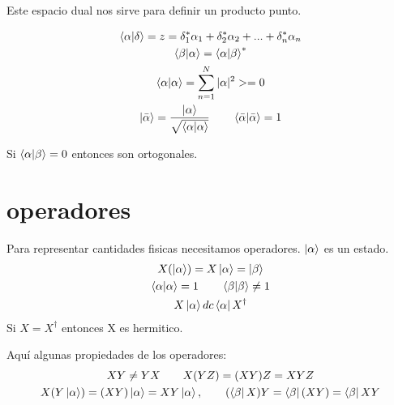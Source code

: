 \documentclass{article}
\newcommand{\caja}[2]{%
  \begin{tcolorbox}[colback=blue!5!white,colframe=blue!25!black,title=#1]
    #2
  \end{tcolorbox}%
}
\begin{document}
Este espacio dual nos sirve para definir un producto punto.
\caja{producto punto }{
  \begin{gather}
    \bra{\alpha}\ket{\delta} = z = \delta _{1 } ^ {* }\alpha _1 + \delta _2 ^ {* }\alpha _{2 } + ... + \delta _{n } ^ {* }\alpha_n\\
    \bra{\beta}\ket{\alpha}=\bra{\alpha}\ket{\beta}^ {* }\\
    \bra{\alpha}\ket{\alpha} = \sum_{n=1 }^{N }|\alpha|^ {2} >= 0 \\
    \ket{\bar \alpha} = \frac{\ket{\alpha}}{\sqrt{\bra{\alpha}\ket{\alpha}} } \qquad
    \bra{\bar \alpha}\ket{\bar \alpha}=1
    \label{eq:bracket}
  \end{gather}
}

Si $ \bra{\alpha}\ket{\beta} = 0  $ entonces son ortogonales.

\section{operadores} %
\label{sec:operadores}
\caja{operadores }{
  Para representar cantidades fisicas necesitamos operadores. $ \ket{\alpha} $ es un estado.
  \begin{gather}
    X(\ket{\alpha}) =  X \ket{\alpha} = \ket{\beta}\\
    \bra{\alpha}\ket{\alpha} = 1 \qquad \bra{\beta}\ket{\beta} \neq 1\\
    X \ket{\alpha} dc \bra{\alpha}X ^ {\dag}
    \label{eq:operadores }
  \end{gather}
  Si $ X = X ^ {\dag} $ entonces X es hermitico. 
}

Aquí algunas propiedades de los operadores: 
\begin{gather}
  XY \neq YX \qquad X(YZ) = (XY)Z = XYZ\\
  X(Y \ket{\alpha}) = (XY)\ket{\alpha}=XY \ket{\alpha}, \qquad (\bra{\beta}X)Y = \bra{\beta} (XY) = \bra{\beta}XY
  \label{eq:prop.operadores }
\end{gather}
\end{document}
